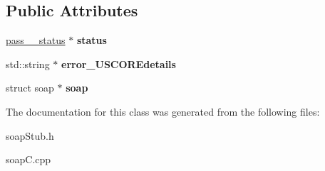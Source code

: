 \subsection*{Public Attributes}
\begin{DoxyCompactItemize}
\item 
\hypertarget{classpass____pass__USCOREfault_ac30f28ddb982b808b28b314b48d5590e}{
\hyperlink{classpass____status}{pass\_\-\_\-status} $\ast$ {\bfseries status}}
\label{classpass____pass__USCOREfault_ac30f28ddb982b808b28b314b48d5590e}

\item 
\hypertarget{classpass____pass__USCOREfault_a1e8d029645bda3b04058d3d58700ae87}{
std::string $\ast$ {\bfseries error\_\-USCOREdetails}}
\label{classpass____pass__USCOREfault_a1e8d029645bda3b04058d3d58700ae87}

\item 
\hypertarget{classpass____pass__USCOREfault_a122f56a2bb7290e4c632f17cb705194a}{
struct soap $\ast$ {\bfseries soap}}
\label{classpass____pass__USCOREfault_a122f56a2bb7290e4c632f17cb705194a}

\end{DoxyCompactItemize}


The documentation for this class was generated from the following files:\begin{DoxyCompactItemize}
\item 
soapStub.h\item 
soapC.cpp\end{DoxyCompactItemize}
